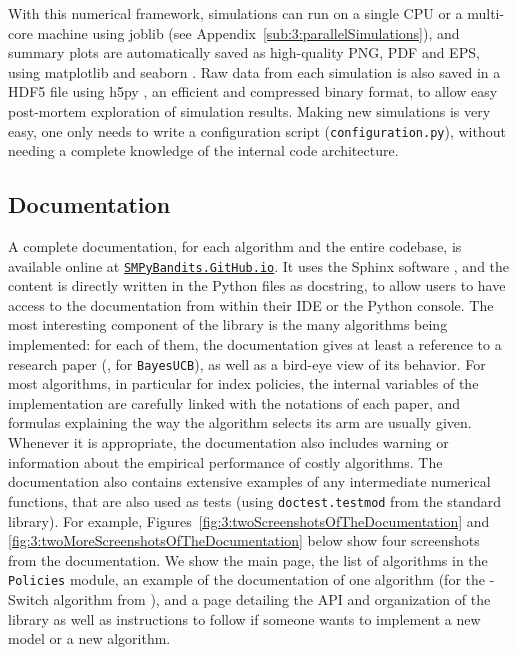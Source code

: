 With this numerical framework, simulations can run on a single CPU or a multi-core machine using joblib \cite{joblib} (see Appendix~\ref{sub:3:parallelSimulations}),
and summary plots are automatically saved as high-quality PNG, PDF and EPS, using matplotlib \cite{matplotlib} and seaborn \cite{seaborn}.
Raw data from each simulation is also saved in a HDF5 file using h5py \cite{h5py}, an efficient and compressed binary format, to allow easy post-mortem exploration of simulation results.
Making new simulations is very easy, one only needs to write a configuration script (\texttt{configuration.py}), without needing a complete knowledge of the internal code architecture.


\subsection{Documentation}

A complete documentation, for each algorithm and the entire codebase, is available online at
\texttt{\href{https://SMPyBandits.GitHub.io}{SMPyBandits.GitHub.io}}.
It uses the Sphinx software \cite{sphinx}, and the content is directly written in the Python files as docstring, to allow users to have access to the documentation from within their IDE or the Python console.
The most interesting component of the library is the many algorithms being implemented: for each of them, the documentation gives at least a reference to a research paper (\eg, \cite{Kaufmann12BUCB} for \texttt{BayesUCB}), as well as a bird-eye view of its behavior.
For most algorithms, in particular for index policies, the internal variables of the implementation are carefully linked with the notations of each paper, and formulas explaining the way the algorithm selects its arm are usually given.
Whenever it is appropriate, the documentation also includes warning or information about the empirical performance of costly algorithms.
The documentation also contains extensive examples of any intermediate numerical functions, that are also used as tests (using \texttt{doctest.testmod} from the standard library).
For example, Figures~\ref{fig:3:twoScreenshotsOfTheDocumentation} and \ref{fig:3:twoMoreScreenshotsOfTheDocumentation} below show four screenshots from the documentation.
We show the main page, the list of algorithms in the \texttt{Policies} module, an example of the documentation of one algorithm (for the \klUCB-Switch algorithm from \cite{Garivier18}), and a page detailing the API and organization of the library as well as instructions to follow if someone wants to implement a new model or a new algorithm.

